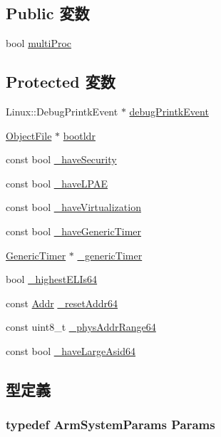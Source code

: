 \subsection*{Public 変数}
\begin{DoxyCompactItemize}
\item 
bool \hyperlink{classArmSystem_a872f015757d394b551ccf79cfb2c7979}{multiProc}
\end{DoxyCompactItemize}
\subsection*{Protected 変数}
\begin{DoxyCompactItemize}
\item 
Linux::DebugPrintkEvent $\ast$ \hyperlink{classArmSystem_aedceac66468548dd7c74a37cb968a83b}{debugPrintkEvent}
\item 
\hyperlink{classObjectFile}{ObjectFile} $\ast$ \hyperlink{classArmSystem_ac52aedcc0c513ce741fac3ea80c9b0d1}{bootldr}
\item 
const bool \hyperlink{classArmSystem_afc4f86a45efbe233466dde9b89cf3fd5}{\_\-haveSecurity}
\item 
const bool \hyperlink{classArmSystem_a1215984ae18da163f0042f3e1fc64403}{\_\-haveLPAE}
\item 
const bool \hyperlink{classArmSystem_a24146119795922982380e6b02b898a37}{\_\-haveVirtualization}
\item 
const bool \hyperlink{classArmSystem_aca3aa280f7b7c05a9b554608cfaf4418}{\_\-haveGenericTimer}
\item 
\hyperlink{classGenericTimer}{GenericTimer} $\ast$ \hyperlink{classArmSystem_a5402fcff3a17875626c3a32694fa7303}{\_\-genericTimer}
\item 
bool \hyperlink{classArmSystem_a34da8e2d4b4cf578fc6f605d89aec207}{\_\-highestELIs64}
\item 
const \hyperlink{base_2types_8hh_af1bb03d6a4ee096394a6749f0a169232}{Addr} \hyperlink{classArmSystem_a44d32244f9a93e43785fd25bf729ec55}{\_\-resetAddr64}
\item 
const uint8\_\-t \hyperlink{classArmSystem_aca8ae8dd2646e41f8b1e1db3bf8153e3}{\_\-physAddrRange64}
\item 
const bool \hyperlink{classArmSystem_aa8ec26eb0cbc124e0b9f5338b476ebfa}{\_\-haveLargeAsid64}
\end{DoxyCompactItemize}


\subsection{型定義}
\hypertarget{classArmSystem_a8ae84e66b34bac08937a6bad4412ba5d}{
\subsubsection[{Params}]{\setlength{\rightskip}{0pt plus 5cm}typedef ArmSystemParams {\bf Params}}}
\label{classArmSystem_a8ae84e66b34bac08937a6bad4412ba5d}


